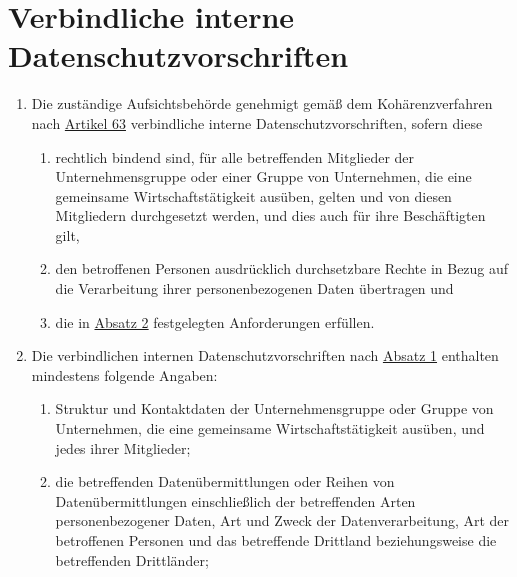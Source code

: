 \chapter{Verbindliche interne Datenschutzvorschriften}
\label{ch:47}


\begin{enumerate}

  \item Die zuständige Aufsichtsbehörde genehmigt gemäß dem Kohärenzverfahren nach \hyperref[ch:63]{Artikel 63}
   verbindliche interne Datenschutzvorschriften, sofern diese
  \label{itm:47-1}

  \begin{enumerate}
  
    \item rechtlich bindend sind, für alle betreffenden Mitglieder der Unternehmensgruppe oder einer Gruppe von
     Unternehmen, die eine gemeinsame Wirtschaftstätigkeit ausüben, gelten und von diesen Mitgliedern durchgesetzt
     werden, und dies auch für ihre Beschäftigten gilt,
    \label{itm:47-1a}

    \item den betroffenen Personen ausdrücklich durchsetzbare Rechte in Bezug auf die Verarbeitung ihrer
     personenbezogenen Daten übertragen und
    \label{itm:47-1b}

    \item die in \hyperref[itm:47-2]{Absatz 2} festgelegten Anforderungen erfüllen.
    \label{itm:47-1c}

  \end{enumerate}

  \item Die verbindlichen internen Datenschutzvorschriften nach \hyperref[itm:47-1]{Absatz 1} enthalten mindestens
   folgende Angaben:
  \label{itm:47-2}

  \begin{enumerate}
  
    \item Struktur und Kontaktdaten der Unternehmensgruppe oder Gruppe von Unternehmen, die eine gemeinsame
     Wirtschaftstätigkeit ausüben, und jedes ihrer Mitglieder;
    \label{itm:4722a}

    \item die betreffenden Datenübermittlungen oder Reihen von Datenübermittlungen einschließlich der betreffenden Arten
     personenbezogener Daten, Art und Zweck der Datenverarbeitung, Art der betroffenen Personen und das betreffende
     Drittland beziehungsweise die betreffenden Drittländer;
    \label{itm:47-2b}


\end{enumerate}
\end{enumerate}
